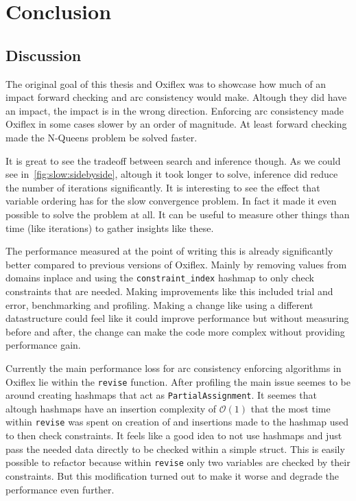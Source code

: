 
\chapter{Conclusion} \label{chap:conclusion}

\section{Discussion}

The original goal of this thesis and Oxiflex was to showcase how much of an impact forward checking and arc consistency would make. Altough they did have an impact, the impact is in the wrong direction. Enforcing arc consistency made Oxiflex in some cases slower by an order of magnitude. At least forward checking made the N-Queens problem be solved faster.

It is great to see the tradeoff between search and inference though. As we could see in~\cref{fig:slow:sidebyside}, altough it took longer to solve, inference did reduce the number of iterations significantly. It is interesting to see the effect that variable ordering has for the slow convergence problem. In fact it made it even possible to solve the problem at all. It can be useful to measure other things than time (like iterations) to gather insights like these.

The performance measured at the point of writing this is already significantly better compared to previous versions of Oxiflex. Mainly by removing values from domains inplace and using the \verb|constraint_index| hashmap to only check constraints that are needed. Making improvements like this included trial and error, benchmarking and profiling. Making a change like using a different datastructure could feel like it could improve performance but without measuring before and after, the change can make the code more complex without providing performance gain.

Currently the main performance loss for arc consistency enforcing algorithms in Oxiflex lie within the \verb|revise| function. After profiling the main issue seemes to be around creating hashmaps that act as \verb|PartialAssignment|. It seemes that altough hashmaps have an insertion complexity of $\mathcal{O}(1)$ that the most time within \verb|revise| was spent on creation of and insertions made to the hashmap used to then check constraints. It feels like a good idea to not use hashmaps and just pass the needed data directly to be checked within a simple struct. This is easily possible to refactor because within \verb|revise| only two variables are checked by their constraints. But this modification turned out to make it worse and degrade the performance even further.

